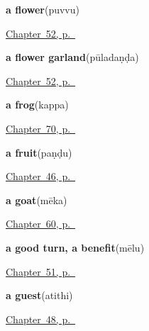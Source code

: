 \noindent\begin{minipage}[t]{\linewidth}
\raggedright
\textbf{a flower}\enspace\emph{}\enspace(puvvu)\par
\footnotesize \hyperref[ch:te-welcome]{Chapter~52, p.~\pageref*{ch:te-welcome}}
\end{minipage}\par\smallskip

\noindent\begin{minipage}[t]{\linewidth}
\raggedright
\textbf{a flower garland}\enspace\emph{}\enspace(pūladaṇḍa)\par
\footnotesize \hyperref[ch:te-welcome]{Chapter~52, p.~\pageref*{ch:te-welcome}}
\end{minipage}\par\smallskip

\noindent\begin{minipage}[t]{\linewidth}
\raggedright
\textbf{a frog}\enspace\emph{}\enspace(kappa)\par
\footnotesize \hyperref[ch:te-small-creatures]{Chapter~70, p.~\pageref*{ch:te-small-creatures}}
\end{minipage}\par\smallskip

\noindent\begin{minipage}[t]{\linewidth}
\raggedright
\textbf{a fruit}\enspace\emph{}\enspace(paṇḍu)\par
\footnotesize \hyperref[ch:te-ask-for]{Chapter~46, p.~\pageref*{ch:te-ask-for}}
\end{minipage}\par\smallskip

\noindent\begin{minipage}[t]{\linewidth}
\raggedright
\textbf{a goat}\enspace\emph{}\enspace(mēka)\par
\footnotesize \hyperref[ch:te-animals]{Chapter~60, p.~\pageref*{ch:te-animals}}
\end{minipage}\par\smallskip

\noindent\begin{minipage}[t]{\linewidth}
\raggedright
\textbf{a good turn, a benefit}\enspace\emph{}\enspace(mēlu)\par
\footnotesize \hyperref[ch:te-courtesy]{Chapter~51, p.~\pageref*{ch:te-courtesy}}
\end{minipage}\par\smallskip

\noindent\begin{minipage}[t]{\linewidth}
\raggedright
\textbf{a guest}\enspace\emph{}\enspace(atithi)\par
\footnotesize \hyperref[ch:te-roles]{Chapter~48, p.~\pageref*{ch:te-roles}}
\end{minipage}\par\smallskip

